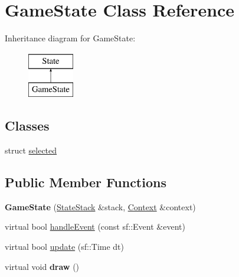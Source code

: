 \hypertarget{classGameState}{\section{\-Game\-State \-Class \-Reference}
\label{classGameState}
}
\-Inheritance diagram for \-Game\-State\-:\begin{figure}[H]
\begin{center}
\leavevmode
\includegraphics[height=2.000000cm]{classGameState}
\end{center}
\end{figure}
\subsection*{\-Classes}
\begin{DoxyCompactItemize}
\item 
struct \hyperlink{structGameState_1_1selected}{selected}
\end{DoxyCompactItemize}
\subsection*{\-Public \-Member \-Functions}
\begin{DoxyCompactItemize}
\item 
\hypertarget{classGameState_aa7d21e6d14f32ba7c2e155a9905b81aa_aa7d21e6d14f32ba7c2e155a9905b81aa}{{\bfseries \-Game\-State} (\hyperlink{classStateStack}{\-State\-Stack} \&stack, \hyperlink{classContext}{\-Context} \&context)}\label{classGameState_aa7d21e6d14f32ba7c2e155a9905b81aa_aa7d21e6d14f32ba7c2e155a9905b81aa}

\item 
virtual bool \hyperlink{classGameState_a000dd3306b1cb9faab5a86774a22aa6d_a000dd3306b1cb9faab5a86774a22aa6d}{handle\-Event} (const sf\-::\-Event \&event)
\item 
virtual bool \hyperlink{classGameState_a4ac988f0da5c33b43ff356890fcf9c1c_a4ac988f0da5c33b43ff356890fcf9c1c}{update} (sf\-::\-Time dt)
\item 
\hypertarget{classGameState_a3c511417d8934943ae65c04681f321a3_a3c511417d8934943ae65c04681f321a3}{virtual void {\bfseries draw} ()}\label{classGameState_a3c511417d8934943ae65c04681f321a3_a3c511417d8934943ae65c04681f321a3}

\end{DoxyCompactItemize}
